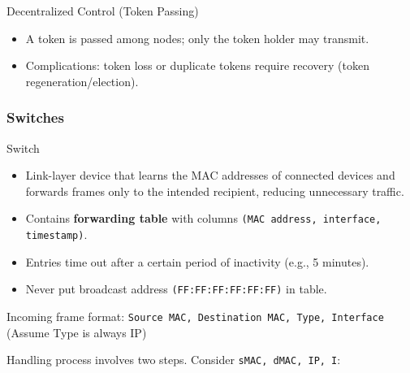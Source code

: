 \begin{definition}
    {Decentralized Control (Token Passing)}
    \begin{itemize}
        \item A token is passed among nodes; only the token holder may transmit.
        \item Complications: token loss or duplicate tokens require recovery (token regeneration/election).
    \end{itemize}
\end{definition}

\subsubsection{Switches}

\begin{definition}
    {Switch}

    \begin{itemize}
        \item Link-layer device that learns the MAC addresses of connected devices and forwards frames only to the intended recipient, reducing unnecessary traffic.
        \item Contains \textbf{forwarding table} with columns \texttt{(MAC address, interface, timestamp)}.
        \item Entries time out after a certain period of inactivity (e.g., 5 minutes).
        \item Never put broadcast address \texttt{(FF:FF:FF:FF:FF:FF)} in table.
    \end{itemize}

    Incoming frame format: \texttt{Source MAC, Destination MAC, Type, Interface} (Assume Type is always IP)

    Handling process involves two steps. Consider \texttt{sMAC, dMAC, IP, I}:


\end{definition}

